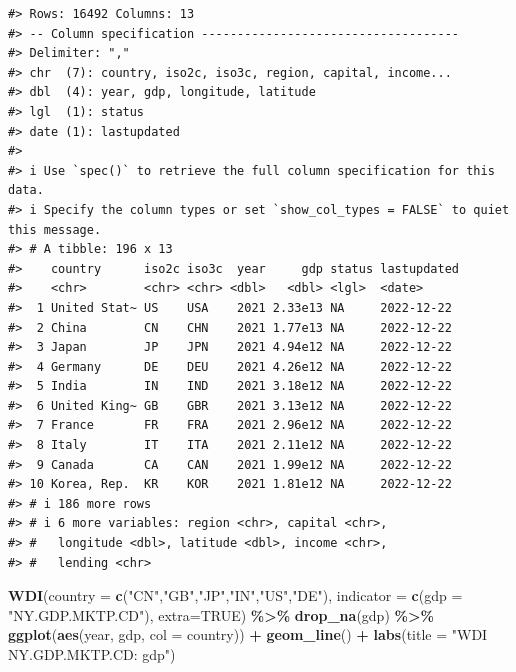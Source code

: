 \documentclass[
  xelatex, ja=standard]{bxjsbook}
\newenvironment{Shaded}{\begin{snugshade}}{\end{snugshade}}
\newcommand{\AttributeTok}[1]{\textcolor[rgb]{0.13,0.29,0.53}{#1}}
\newcommand{\ConstantTok}[1]{\textcolor[rgb]{0.56,0.35,0.01}{#1}}
\newcommand{\FunctionTok}[1]{\textcolor[rgb]{0.13,0.29,0.53}{\textbf{#1}}}
\newcommand{\NormalTok}[1]{#1}
\newcommand{\SpecialCharTok}[1]{\textcolor[rgb]{0.81,0.36,0.00}{\textbf{#1}}}
\newcommand{\StringTok}[1]{\textcolor[rgb]{0.31,0.60,0.02}{#1}}
\theoremstyle{definition}
\theoremstyle{definition}
\theoremstyle{definition}
\theoremstyle{definition}
\theoremstyle{remark}
\begin{document}
\begin{verbatim}
#> Rows: 16492 Columns: 13
#> -- Column specification ------------------------------------
#> Delimiter: ","
#> chr  (7): country, iso2c, iso3c, region, capital, income...
#> dbl  (4): year, gdp, longitude, latitude
#> lgl  (1): status
#> date (1): lastupdated
#> 
#> i Use `spec()` to retrieve the full column specification for this data.
#> i Specify the column types or set `show_col_types = FALSE` to quiet this message.
#> # A tibble: 196 x 13
#>    country      iso2c iso3c  year     gdp status lastupdated
#>    <chr>        <chr> <chr> <dbl>   <dbl> <lgl>  <date>     
#>  1 United Stat~ US    USA    2021 2.33e13 NA     2022-12-22 
#>  2 China        CN    CHN    2021 1.77e13 NA     2022-12-22 
#>  3 Japan        JP    JPN    2021 4.94e12 NA     2022-12-22 
#>  4 Germany      DE    DEU    2021 4.26e12 NA     2022-12-22 
#>  5 India        IN    IND    2021 3.18e12 NA     2022-12-22 
#>  6 United King~ GB    GBR    2021 3.13e12 NA     2022-12-22 
#>  7 France       FR    FRA    2021 2.96e12 NA     2022-12-22 
#>  8 Italy        IT    ITA    2021 2.11e12 NA     2022-12-22 
#>  9 Canada       CA    CAN    2021 1.99e12 NA     2022-12-22 
#> 10 Korea, Rep.  KR    KOR    2021 1.81e12 NA     2022-12-22 
#> # i 186 more rows
#> # i 6 more variables: region <chr>, capital <chr>,
#> #   longitude <dbl>, latitude <dbl>, income <chr>,
#> #   lending <chr>
\end{verbatim}

\begin{Shaded}
\begin{Highlighting}[]
\FunctionTok{WDI}\NormalTok{(}\AttributeTok{country =} \FunctionTok{c}\NormalTok{(}\StringTok{"CN"}\NormalTok{,}\StringTok{"GB"}\NormalTok{,}\StringTok{"JP"}\NormalTok{,}\StringTok{"IN"}\NormalTok{,}\StringTok{"US"}\NormalTok{,}\StringTok{"DE"}\NormalTok{), }\AttributeTok{indicator =} \FunctionTok{c}\NormalTok{(}\AttributeTok{gdp =} \StringTok{"NY.GDP.MKTP.CD"}\NormalTok{), }\AttributeTok{extra=}\ConstantTok{TRUE}\NormalTok{) }\SpecialCharTok{\%\textgreater{}\%} \FunctionTok{drop\_na}\NormalTok{(gdp) }\SpecialCharTok{\%\textgreater{}\%} 
  \FunctionTok{ggplot}\NormalTok{(}\FunctionTok{aes}\NormalTok{(year, gdp, }\AttributeTok{col =}\NormalTok{ country)) }\SpecialCharTok{+} \FunctionTok{geom\_line}\NormalTok{() }\SpecialCharTok{+}
  \FunctionTok{labs}\NormalTok{(}\AttributeTok{title =} \StringTok{"WDI NY.GDP.MKTP.CD: gdp"}\NormalTok{)}
\end{Highlighting}
\end{Shaded}
\end{document}
